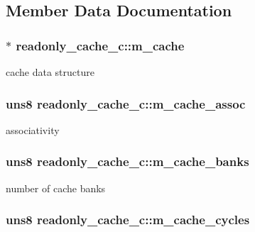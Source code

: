 \subsection{Member Data Documentation}
\hypertarget{classreadonly__cache__c_a3973be1de758a507d08771f9cf07e70b}{
\subsubsection[{m\_\-cache}]{$\ast$ {\bf readonly\_\-cache\_\-c::m\_\-cache}}}
\label{classreadonly__cache__c_a3973be1de758a507d08771f9cf07e70b}
cache data structure \hypertarget{classreadonly__cache__c_a8f7344dfc8e89d9db850b03a6b319fe3}{
\subsubsection[{m\_\-cache\_\-assoc}]{\setlength{\rightskip}{0pt plus 5cm}uns8 {\bf readonly\_\-cache\_\-c::m\_\-cache\_\-assoc}}}
\label{classreadonly__cache__c_a8f7344dfc8e89d9db850b03a6b319fe3}
associativity \hypertarget{classreadonly__cache__c_a2dca3a5ba418a2c288759418f61c2eea}{
\subsubsection[{m\_\-cache\_\-banks}]{\setlength{\rightskip}{0pt plus 5cm}uns8 {\bf readonly\_\-cache\_\-c::m\_\-cache\_\-banks}}}
\label{classreadonly__cache__c_a2dca3a5ba418a2c288759418f61c2eea}
number of cache banks \hypertarget{classreadonly__cache__c_aeb1e6fce6d78c38e6380f63723dd61a0}{
\subsubsection[{m\_\-cache\_\-cycles}]{\setlength{\rightskip}{0pt plus 5cm}uns8 {\bf readonly\_\-cache\_\-c::m\_\-cache\_\-cycles}}}
